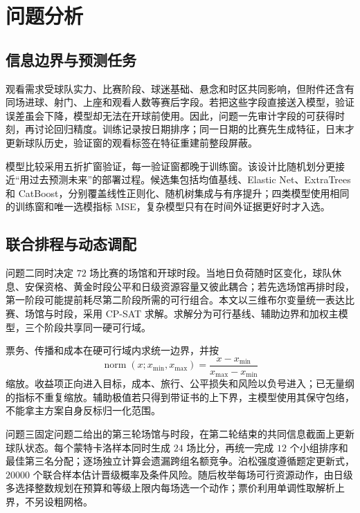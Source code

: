 \section{问题分析}

\subsection{信息边界与预测任务}

观看需求受球队实力、比赛阶段、球迷基础、悬念和时区共同影响，但附件还含有同场进球、射门、上座和观看人数等赛后字段。若把这些字段直接送入模型，验证误差虽会下降，模型却无法在开球前使用。因此，问题一先审计字段的可获得时刻，再讨论回归精度。训练记录按日期排序；同一日期的比赛先生成特征，日末才更新球队历史，验证窗的观看标签在特征重建前整段屏蔽。

模型比较采用五折扩窗验证，每一验证窗都晚于训练窗。该设计比随机划分更接近“用过去预测未来”的部署过程。候选集包括均值基线、Elastic Net、ExtraTrees 和 CatBoost，分别覆盖线性正则化、随机树集成与有序提升；四类模型使用相同的训练窗和唯一选模指标 MSE，复杂模型只有在时间外证据更好时才入选。

\subsection{联合排程与动态调配}

问题二同时决定 $72$ 场比赛的场馆和开球时段。当地日负荷随时区变化，球队休息、安保资格、黄金时段公平和日级资源容量又彼此耦合；若先选场馆再排时段，第一阶段可能提前耗尽第二阶段所需的可行组合。本文以三维布尔变量统一表达比赛、场馆与时段，采用 CP-SAT 求解。求解分为可行基线、辅助边界和加权主模型，三个阶段共享同一硬可行域。

票务、传播和成本在硬可行域内求统一边界，并按
\begin{equation}
\operatorname{norm}(x;x_{\min},x_{\max})=
\frac{x-x_{\min}}{x_{\max}-x_{\min}}
\end{equation}
缩放。收益项正向进入目标，成本、旅行、公平损失和风险以负号进入；已无量纲的指标不重复缩放。辅助极值若只得到带证书的上下界，主模型使用其保守包络，不能拿主方案自身反标归一化范围。

问题三固定问题二给出的第三轮场馆与时段，在第二轮结束的共同信息截面上更新球队状态。每个蒙特卡洛样本同时生成 $24$ 场比分，再统一完成 $12$ 个小组排序和最佳第三名分配；逐场独立计算会遗漏跨组名额竞争。泊松强度遵循题定更新式，$20000$ 个联合样本估计晋级概率及条件风险。随后枚举每场可行资源动作，由日级多选择整数规划在预算和等级上限内每场选一个动作；票价利用单调性取解析上界，不另设粗网格。

